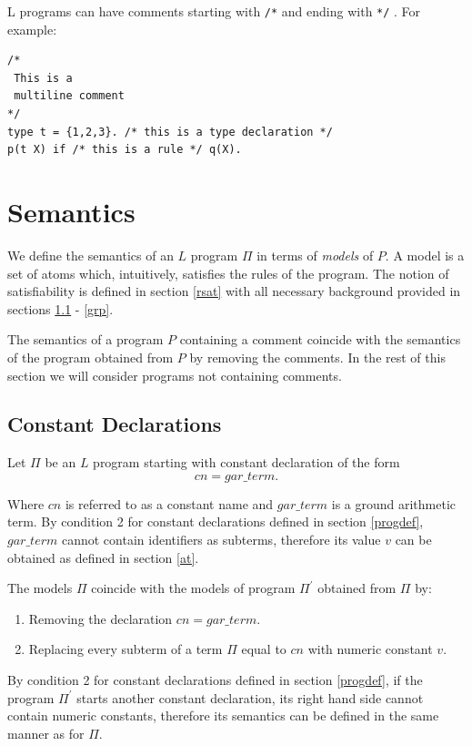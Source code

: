 \documentclass[a4paper,10pt]{article}
\begin{document}
L programs can have comments starting with \texttt{/*} and ending with \texttt{*/} . For example:

\begin{verbatim}
/*
 This is a
 multiline comment
*/
type t = {1,2,3}. /* this is a type declaration */
p(t X) if /* this is a rule */ q(X). 
\end{verbatim}


\section{Semantics}
We define the semantics of an $L$ program $\Pi$ in terms of \textit{models} of $P$. A model is a set of atoms which, intuitively, satisfies the rules of the program. The notion of satisfiability is defined in section \ref{rsat} with all necessary background provided in sections 
\ref{constants} - \ref{grp}.

The semantics of a program $P$ containing a comment coincide with the semantics of the program obtained from $P$ by removing the comments. In the rest of this section we will consider programs not containing comments.




\subsection{Constant Declarations} \label{constants}


Let $\Pi$ be an $L$ program starting with constant declaration of the form
$$cn = gar\_term.$$

Where $cn$ is referred to as a constant name and $gar\_term$ is a ground arithmetic term.
By condition 2 for constant declarations defined in section \ref{progdef}, $gar\_term$ cannot contain identifiers as subterms,
therefore its value $v$ can be obtained as defined in section \ref{at}. 

The models $\Pi$ coincide with the models of program $\Pi^\prime$ obtained from $\Pi$ by:
\begin{enumerate}
\item Removing the declaration $cn = gar\_term.$
\item Replacing every subterm of a term $\Pi$ equal to $cn$ with numeric constant $v$. 
\end{enumerate} 


\medskip\noindent
By condition 2 for constant declarations defined in section \ref{progdef}, if the program $\Pi^\prime$ starts another constant declaration, its right hand side cannot contain numeric constants, therefore its semantics can be defined in the same manner as for $\Pi$.
 
\end{document}

